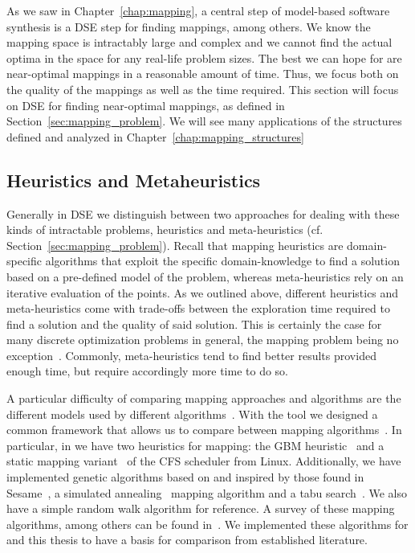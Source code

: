As we saw in Chapter~\ref{chap:mapping}, a central step of model-based software synthesis is a \ac{DSE} step for finding mappings, among others.
We know the mapping space is intractably large and complex and we cannot find the actual optima in the space for any real-life problem sizes.
The best we can hope for are near-optimal mappings in a reasonable amount of time.
Thus, we focus both on the quality of the mappings as well as the time required.
This section will focus on \ac{DSE} for finding near-optimal mappings, as defined in Section~\ref{sec:mapping_problem}. 
We will see many applications of the structures defined and analyzed in Chapter~\ref{chap:mapping_structures}

\subsection{Heuristics and Metaheuristics}
\label{sec:heuristics_vs_metaheuristics}

Generally in \ac{DSE} we distinguish between two approaches for dealing with these kinds of intractable problems, heuristics and meta-heuristics (cf. Section~\ref{sec:mapping_problem}).
Recall that mapping heuristics are domain-specific algorithms that exploit the specific domain-knowledge to find a solution based on a pre-defined model of the problem, whereas meta-heuristics rely on an iterative evaluation of the points.
As we outlined above, different heuristics and meta-heuristics come with trade-offs between the exploration time required to find a solution and the quality of said solution.
This is certainly the case for many discrete optimization problems in general, the mapping problem being no exception~\cite{goens_mcsoc16}.
Commonly, meta-heuristics tend to find better results provided enough time, but require accordingly more time to do so.

A particular difficulty of comparing mapping approaches and algorithms are the different models used by different algorithms~\cite{goens_mcsoc16}.
With the \mocasin tool we designed a common framework that allows us to compare between mapping algorithms~\cite{menard_rapido21}.
In particular, in \mocasin we have two heuristics for mapping: the \ac{GBM} heuristic~\cite{castrillon_dac12} and a static mapping variant~\cite{menard_rapido21} of the \ac{CFS} scheduler from Linux.
Additionally, we have implemented genetic algorithms based on and inspired by those found in Sesame~\cite{erbas2006multiobjective,quan2014towards,goens_mcsoc16}, a simulated annealing~\cite{simulated_annealing} mapping algorithm and a tabu search~\cite{tabu_search}.
We also have a simple random walk algorithm for reference.
A survey of these mapping algorithms, among others can be found in~\cite{singh2013mapping}.
We implemented these algorithms for \mocasin and this thesis to have a basis for comparison from established literature.

